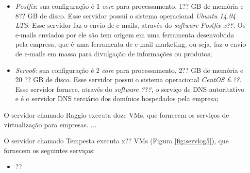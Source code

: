 \begin{itemize}
 \item \textit{Postfix}: sua configuração é 1 \textit{core} para processamento, 1?? GB de memória e 8?? GB de disco. Esse servidor possui o 
 sistema operacional \textit{Ubuntu 14.04 \ac{LTS}}. Esse servidor faz o envio de e-mails, através do \textit{software} \textit{Postfix x??}.
 Os e-mails enviados por ele são tem origem em uma ferramenta desenvolvida pela empresa, que é uma ferramenta de e-mail marketing, ou seja, 
 faz o envio de e-mails em massa para divulgação de informações ou produtos;
 
 \item \textit{Servo6}: sua configuração é 2 \textit{core} para processamento, 2?? GB de memória e 20 ?? GB de disco. Esse servidor possui o 
 sistema operacional \textit{CentOS 6.??}. Esse servidor fornece, através do \textit{software} \textit{???}, o serviço de \ac{DNS} autoritativo 
 e é o servidor \ac{DNS} terciário dos domínios hospedados pela empresa;
\end{itemize}

O servidor chamado Raggio executa doze \ac{VM}s, que fornecem os serviços de virtualização para empresas.
...

O servidor chamado Tempesta executa x?? \ac{VM}s (Figura \ref{fig:servlog5}), que fornecem os seguintes serviços:
\begin{itemize}
 \item ??
\end{itemize}

